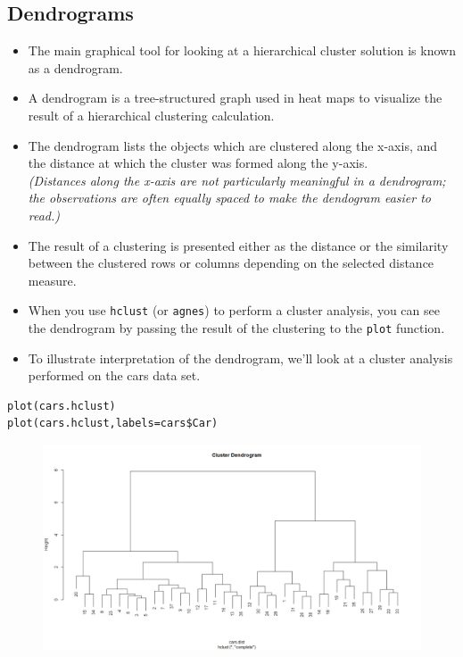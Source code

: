 \documentclass[12pt]{article}
\begin{document}
\subsection{Dendrograms}
\begin{itemize}
\item The main graphical tool for looking at a hierarchical cluster solution is known as a dendrogram. 
\item A dendrogram is a tree-structured graph used in heat maps to visualize the result of a hierarchical clustering calculation. 
\item The dendrogram lists the objects which are clustered along the x-axis, and the distance at which the cluster was formed along the y-axis. \\ \textit{(Distances along the x-axis are not particularly meaningful in a dendrogram; the observations are often equally spaced to make the dendogram easier to read.) 
}
\item 
The result of a clustering is presented either as the distance or the similarity between the clustered rows or columns depending on the selected distance measure. 
\item  
When you use \texttt{hclust} (or \texttt{agnes}) to perform a cluster analysis, you can see the dendrogram by passing the result of the clustering to the \texttt{plot} function.
\item 
To illustrate interpretation of the dendrogram, we'll look at a cluster analysis performed on the cars data set.
\end{itemize}
\newpage
\begin{framed}
\begin{verbatim}
plot(cars.hclust)
plot(cars.hclust,labels=cars$Car)
\end{verbatim}
\end{framed}
\newpage
\begin{figure}[h!]
\centering
\includegraphics[width=0.9\linewidth]{./Carsdendro1}

\label{fig:Carsdendro1}
\end{figure}
\end{document}
